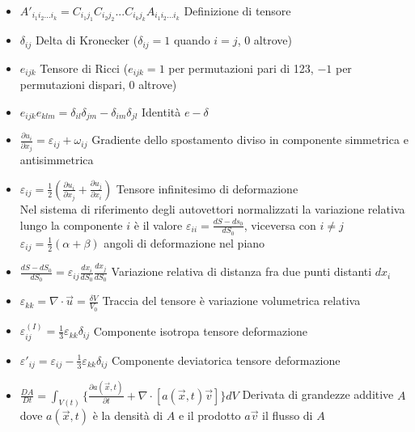 \documentclass[a4paper]{article}
\begin{document}
\begin{itemize}
	\item $A'_{i_1i_2...i_k}=C_{i_1j_1}C_{i_2j_2}...C_{i_kj_k}A_{i_1i_2...i_k}$ Definizione di tensore
	
	\item $\delta_{ij}$ Delta di Kronecker ($\delta_{ij} = 1$ quando $i=j$, $0$ altrove)
	
	\item $e_{ijk}$ Tensore di Ricci ($e_{ijk}=1$ per permutazioni pari di 123, $-1$ per permutazioni dispari, $0$ altrove)
	
	\item $e_{ijk}e_{klm}=\delta_{il}\delta_{jm}-\delta_{im}\delta_{jl}$ Identità $e-\delta$
	
	\item $\frac{\partial u_i}{\partial x_j} = \varepsilon_{ij}+\omega_{ij}$ Gradiente dello spostamento diviso in componente simmetrica e antisimmetrica
	
	\item $\varepsilon_{ij}=\frac{1}{2}(\frac{\partial u_i}{\partial x_j}+\frac{\partial u_j}{\partial x_i})$ Tensore infinitesimo di deformazione\\
	Nel sistema di riferimento degli autovettori normalizzati la variazione relativa lungo la componente $i$ è il valore $\varepsilon_{ii} = \frac{dS-ds_0}{dS_0}$, viceversa con $i \neq j$  $\varepsilon_{ij}=\frac{1}{2}(\alpha + \beta)$ angoli di deformazione nel piano
	
	\item $\frac{dS-dS_0}{dS_0}=\varepsilon_{ij} \frac{dx_i}{dS_0} \frac{dx_j}{dS_0}$ Variazione relativa di distanza fra due punti distanti $dx_i$
	
	\item $ \varepsilon_{kk}=\nabla \cdot \overrightarrow{u} = \frac{\delta V}{V_0}$ Traccia del tensore è variazione volumetrica relativa
	
	\item $\varepsilon^{(I)}_{ij} = \frac{1}{3} \varepsilon_{kk}\delta_{ij}$ Componente isotropa tensore deformazione
	
	\item $\varepsilon'_{ij} = \varepsilon_{ij} -\frac{1}{3} \varepsilon_{kk}\delta_{ij}$ Componente deviatorica tensore deformazione
	
	\item $\frac{DA}{Dt}=\int_{V(t)} \{ \frac{\partial a(\overrightarrow{x},t)}{\partial t} + \nabla \cdot [a(\overrightarrow{x}, t)\overrightarrow{v}] \} dV$ Derivata di grandezze additive $A$ dove $a(\overrightarrow{x},t)$ è la densità di $A$ e il prodotto $a \overrightarrow{v}$ il flusso di $A$
	

\end{itemize}
\end{document}
